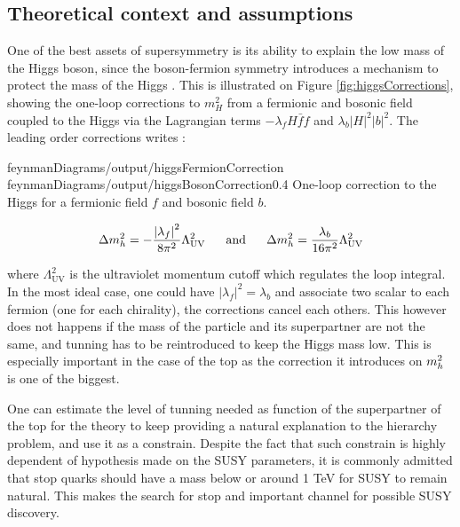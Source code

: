         \subsection{Theoretical context and assumptions}

        One of the best assets of supersymmetry is its ability to explain the low mass
        of the Higgs boson, since the boson-fermion symmetry introduces a mechanism to
        protect the mass of the Higgs . This is illustrated on Figure
        \ref{fig:higgsCorrections}, showing the one-loop corrections to $m_H^2$
        from a fermionic and bosonic field coupled to the Higgs via the Lagrangian terms
        $- \lambda_f H \bar{f} f$ and $\lambda_b \left| H \right|^2 \left| b \right|^2$.
        The leading order corrections writes :

        {feynmanDiagrams/output/higgsFermionCorrection}
        {feynmanDiagrams/output/higgsBosonCorrection}{0.4}
        {One-loop correction to the Higgs for a fermionic field $f$ and bosonic field $b$.}

        \begin{equation}
            \Delta m_{h}^2 = - \frac{\left| \lambda_f \right|^2}{8\pi^2} \Lambda^2_{\text{UV}}
            \, \, \, \, \, \, \, \, \, \, \text{and} \, \, \, \, \, \, \, \, \, \,
            \Delta m_{h}^2 =   \frac{\lambda_b}{16\pi^2} \Lambda^2_{\text{UV}}
        \end{equation}

        where $\Lambda^2_{\text{UV}}$ is the ultraviolet momentum cutoff which regulates
        the loop integral. In the most ideal case, one could have $\left| \lambda_f \right|^2
        = \lambda_b$ and associate two scalar to each fermion (one for each chirality), 
        the corrections cancel each others. 
        This however does not happens if the mass of the particle and its superpartner 
        are not the same, and tunning has to be reintroduced to keep the Higgs mass low.
        This is especially important in the case of the top as the correction it introduces
        on $m_{h}^2$ is one of the biggest. 
        
        One can estimate the level of tunning needed as function of the superpartner of
        the top for the theory to keep providing a natural explanation to the hierarchy
        problem, and use it as a constrain. Despite the fact that such constrain is 
        highly dependent of hypothesis made on the SUSY parameters, it is commonly admitted 
        that stop quarks should have a mass below or around 1 TeV for SUSY to remain natural.
        This makes the search for stop and important channel for possible SUSY discovery.

